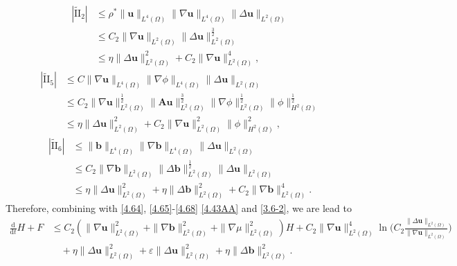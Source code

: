 \documentclass[11pt]{article}
\numberwithin{equation}{section}
\begin{document}
\begin{equation}\label{4.65}
\begin{split}
| \tilde{\text{II}}_2|&\leq \rho^*\|\mathbf{u}\|_{L^4(\Omega)}\|\nabla \mathbf{u}\|_{L^4(\Omega)}\|\Delta \mathbf{u}\|_{L^2(\Omega)}\\
&\leq C_{2}\|\nabla \mathbf{u}\|_{L^2(\Omega)}\|\Delta \mathbf{u}\|_{L^2(\Omega)}^{\frac{3}{2}}\\&
\leq \eta\|\Delta \mathbf{u}\|_{L^2(\Omega)}^2+C_{2}\|\nabla \mathbf{u}\|_{L^2(\Omega)}^4,
\end{split}
\end{equation}
\begin{equation}\label{4.66}
\begin{split}
| \tilde{\text{II}}_5|&\leq C\|\nabla \mathbf{u}\|_{L^4(\Omega)}\|\nabla\phi\|_{L^4(\Omega)}\|\Delta \mathbf{u}\|_{L^2(\Omega)}\\
&\leq C_{2}\|\nabla \mathbf{u}\|_{L^2(\Omega)}^{\frac{1}{2}}\|\mathbf{A} \mathbf{u}\|_{L^2(\Omega)}^{\frac{3}{2}}\|\nabla\phi\|_{L^2(\Omega)}^{\frac{1}{2}}
\|\phi\|_{H^2(\Omega)}^{\frac{1}{2}}\\
&\leq \eta\|\Delta \mathbf{u}\|_{L^2(\Omega)}^2+C_{2}\|\nabla \mathbf{u}\|_{L^2(\Omega)}^2\|\phi\|_{H^2(\Omega)}^2,
\end{split}
\end{equation}
\begin{equation}\label{4.68}
\begin{split}
| \tilde{\text{II}}_6|&\leq \|\mathbf{b}\|_{L^4(\Omega)}\|\nabla \mathbf{b}\|_{L^4(\Omega)}\|\Delta \mathbf{u}\|_{L^2(\Omega)}\\
&\leq C_{2}\|\nabla \mathbf{b}\|_{L^2(\Omega)}\|\Delta \mathbf{b}\|_{L^2(\Omega)}^{\frac{1}{2}}\|\Delta \mathbf{u}\|_{L^2(\Omega)}\\
&\leq \eta\|\Delta \mathbf{u}\|_{L^2(\Omega)}^2+\eta\|\Delta \mathbf{b}\|_{L^2(\Omega)}^2+C_{2}\|\nabla \mathbf{b}\|_{L^2(\Omega)}^4.
\end{split}
\end{equation}
Therefore,  combining with \eqref{4.64},  \eqref{4.65}-\eqref{4.68}   \eqref{4.43AA} and  \eqref{3.6-2},
 we are lead to
\begin{equation}\label{4.72}
\begin{split}
\frac{\mathrm{d}}{\mathrm{d}t}H+F
&\leq C_2(\|\nabla \mathbf{u}\|_{L^2(\Omega)}^2 +\|\nabla \mathbf{b}\|_{L^2(\Omega)}^2 +\|\nabla \mu\|_{L^2(\Omega)}^2)H + C_2\|\nabla \mathbf{u}\|_{L^2(\Omega)}^4 \ln\Big(C_2\frac{\| \Delta\mathbf{u}\|_{L^2(\Omega)}}{\|\nabla \mathbf{u}\|_{L^2(\Omega)}}\Big)\\&\quad+\eta\|\Delta \mathbf{u}\|_{L^2(\Omega)}^2+\varepsilon\|\Delta \mathbf{u}\|_{L^2(\Omega)}^2+\eta\|\Delta \mathbf{b}\|_{L^2(\Omega)}^2.
\end{split}
\end{equation}
\end{document}
